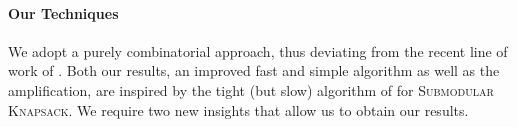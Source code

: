 \documentclass[a4paper,UKenglish,cleveref, autoref]{lipics-v2019}
\newcommand{\SK}{{\textsc{Submodular Knapsack}}\xspace}
\begin{document}
%
%

\paragraph*{Our Techniques}
We adopt a purely combinatorial approach, thus deviating from the recent line of work of \cite{badanidiyuru2014fast,Alina2017}.
Both our results, an improved fast and simple algorithm as well as the amplification, are inspired by the tight (but slow) algorithm of \cite{khuller1999budgeted,sviridenko2004note} for \SK.
We require two new insights that allow us to obtain our results.
\end{document}
